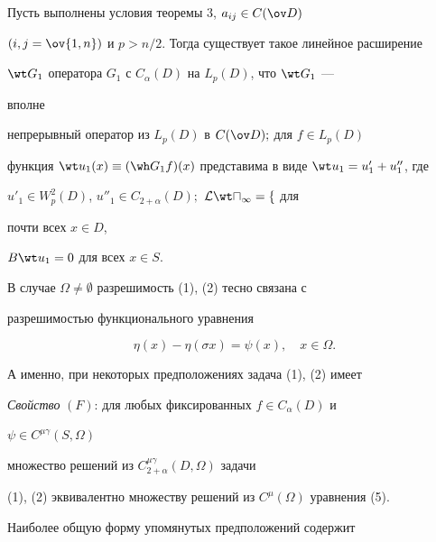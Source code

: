 \begin{thm} 


Пусть выполнены условия теоремы $3$, $a_{i j}\in C(\ov D)$ 


$(i,j=\ov{1,n})$ и $p>n/2$. Тогда существует такое линейное расширение 


$\wt G_1$ оператора $G_1$ с $C_\alpha(D)$ на $L_p(D)$, что $\wt G_1$ --- 


вполне 


непрерывный оператор из $L_p(D)$ в $C(\ov D);$ для $f\in L_p(D)$ 


функция $\wt u_1(x)\equiv(\wh G_1f)(x)$ представима в виде $\wt 


u_1=u'_1+u''_1$, где 


$u'_1\in W^2_p(D)$, $u''_1\in C_{2+\alpha}(D);$ $\cal L\wt u_1=f$ для 


почти всех $x\in D$, 


$B\wt u_1=0$ для всех $x\in S$. 


\end{thm} 


 


В случае $\Omega\ne\emptyset$ разрешимость (1), (2) тесно связана с 


разрешимостью функционального уравнения 


\begin{equation} 


\eta(x)-\eta(\sigma x)=\psi(x),\quad x\in\Omega. 


\end{equation} 


А именно, при некоторых предположениях задача (1), (2) имеет 


\medskip 


 


{\it Свойство} $(F)$: для любых фиксированных $f\in C_\alpha(D)$ и 


$\psi\in C^{\mu\gamma}(S,\Omega)$ 


множество решений из $C^{\mu\gamma}_{2+\alpha}(D,\Omega)$ задачи 


(1), (2) эквивалентно множеству решений из $C^\mu(\Omega)$ уравнения (5). 


\medskip 


 


Наиболее общую форму упомянутых предположений содержит 


 


